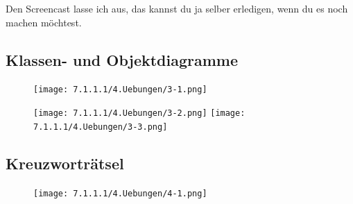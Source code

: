 \documentclass{scrartcl}   %
\begin{document}
Den Screencast lasse ich aus, das kannst du ja selber erledigen, wenn du es noch machen möchtest.

\newpage

\subsection{Klassen- und Objektdiagramme}

\begin{figure}[ht]
    \centering
	\texttt{[image: 7.1.1.1/4.Uebungen/3-1.png]}
\end{figure}

\vspace{0.5cm}

\begin{figure}[ht]
	\centering
	\texttt{[image: 7.1.1.1/4.Uebungen/3-2.png]}
	\hspace{0.5cm}
	\texttt{[image: 7.1.1.1/4.Uebungen/3-3.png]}
\end{figure}

\newpage

\subsection{Kreuzworträtsel}

\begin{figure}[ht]
    \centering
	\texttt{[image: 7.1.1.1/4.Uebungen/4-1.png]}
\end{figure}
\end{document}
